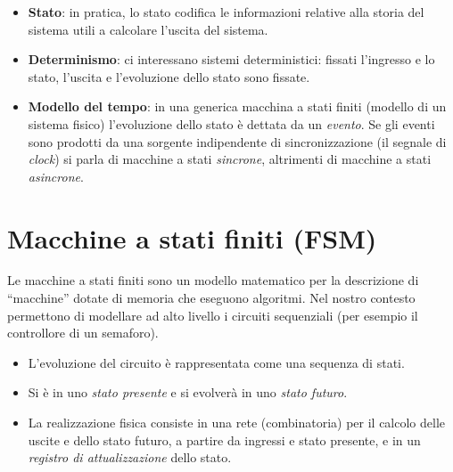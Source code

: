 \documentclass[11pt,a4paper]{article}
\begin{document}
\begin{itemize}
    \item \textbf{Stato}: in pratica, lo stato codifica le informazioni relative alla storia del sistema utili a calcolare l'uscita del sistema.
    \item \textbf{Determinismo}: ci interessano sistemi deterministici: fissati l'ingresso e lo stato, l'uscita e l'evoluzione dello stato sono fissate.
    \item \textbf{Modello del tempo}: in una generica macchina a stati finiti (modello di un sistema fisico) l'evoluzione dello stato è dettata da un \emph{evento}. Se gli eventi sono prodotti da una sorgente indipendente di sincronizzazione (il segnale di \emph{clock}) si parla di macchine a stati \emph{sincrone}, altrimenti di macchine a stati \emph{asincrone}.
\end{itemize}

\section{Macchine a stati finiti (FSM)}

Le macchine a stati finiti sono un modello matematico per la descrizione di ``macchine'' dotate di memoria che eseguono algoritmi. Nel nostro contesto permettono di modellare ad alto livello i circuiti sequenziali (per esempio il controllore di un semaforo).
\begin{itemize}
    \item L'evoluzione del circuito è rappresentata come una sequenza di stati.
    \item Si è in uno \emph{stato presente} e si evolverà in uno \emph{stato futuro}.
    \item La realizzazione fisica consiste in una rete (combinatoria) per il calcolo delle uscite e dello stato futuro, a partire da ingressi e stato presente, e in un \emph{registro di attualizzazione} dello stato.
\end{itemize}
\end{document}
